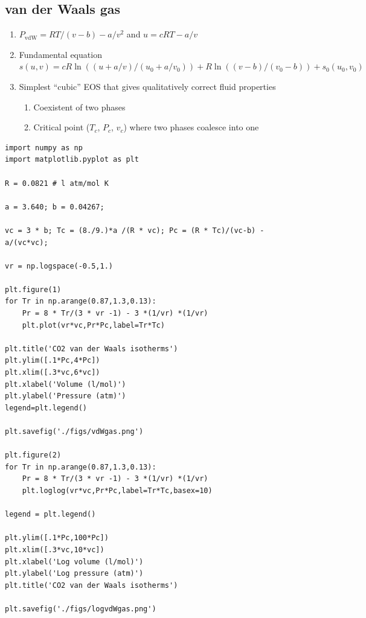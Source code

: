\documentclass[11pt]{article}
\begin{document}
\subsection{van der Waals gas}
\label{sec:org464e0ee}
\begin{enumerate}
\item \(P_\text{vdW}=RT/(v-b) - a/v^2\) and \(u = cRT - a/v\)
\item Fundamental equation \(s(u,v)=cR \ln((u+a/v)/(u_0+a/v_0))+R  \ln ((v-b)/(v_0-b)) + s_0(u_0,v_0)\)
\item Simplest ``cubic'' EOS that gives qualitatively correct fluid properties
\begin{enumerate}
\item Coexistent of two phases
\item Critical point (\(T_c\), \(P_c\), \(v_c\)) where two phases coalesce into one
\end{enumerate}
\end{enumerate}

\begin{verbatim}
import numpy as np
import matplotlib.pyplot as plt

R = 0.0821 # l atm/mol K

a = 3.640; b = 0.04267;

vc = 3 * b; Tc = (8./9.)*a /(R * vc); Pc = (R * Tc)/(vc-b) - a/(vc*vc);

vr = np.logspace(-0.5,1.)

plt.figure(1)
for Tr in np.arange(0.87,1.3,0.13):
    Pr = 8 * Tr/(3 * vr -1) - 3 *(1/vr) *(1/vr)
    plt.plot(vr*vc,Pr*Pc,label=Tr*Tc)

plt.title('CO2 van der Waals isotherms')
plt.ylim([.1*Pc,4*Pc])
plt.xlim([.3*vc,6*vc])
plt.xlabel('Volume (l/mol)')
plt.ylabel('Pressure (atm)')
legend=plt.legend()

plt.savefig('./figs/vdWgas.png')

plt.figure(2)
for Tr in np.arange(0.87,1.3,0.13):
    Pr = 8 * Tr/(3 * vr -1) - 3 *(1/vr) *(1/vr)
    plt.loglog(vr*vc,Pr*Pc,label=Tr*Tc,basex=10)

legend = plt.legend()

plt.ylim([.1*Pc,100*Pc])
plt.xlim([.3*vc,10*vc])
plt.xlabel('Log volume (l/mol)')
plt.ylabel('Log pressure (atm)')
plt.title('CO2 van der Waals isotherms')

plt.savefig('./figs/logvdWgas.png')
\end{verbatim}
\end{document}
